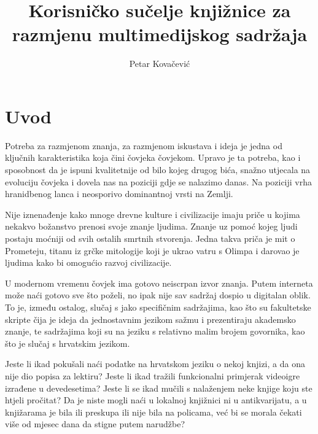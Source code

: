 \documentclass[times, utf8, zavrsni, numeric]{fer}
\newcommand{\razmakp}{\vspace{18pt}}
\begin{document}

\title{Korisničko sučelje knjižnice za razmjenu multimedijskog sadržaja}

\author{Petar Kovačević}

\maketitle

\izvornik

\zahvala{}


\tableofcontents


\chapter{Uvod}

Potreba za razmjenom znanja, za razmjenom iskustava i ideja je jedna od ključnih karakteristika koja čini čovjeka čovjekom.
Upravo je ta potreba, kao i sposobnost da je ispuni kvalitetnije od bilo kojeg drugog bića, snažno utjecala na evoluciju čovjeka i dovela nas na poziciji gdje se nalazimo danas.
Na poziciji vrha hranidbenog lanca i neosporivo dominantnoj vrsti na Zemlji.

Nije iznenađenje kako mnoge drevne kulture i civilizacije imaju priče u kojima nekakvo božanstvo prenosi svoje znanje ljudima.
Znanje uz pomoć kojeg ljudi postaju moćniji od svih ostalih smrtnih stvorenja.
Jedna takva priča je mit o Prometeju, titanu iz grčke mitologije koji je ukrao vatru s Olimpa i darovao je ljudima kako bi omogućio razvoj civilizacije.

\razmakp

U modernom vremenu čovjek ima gotovo neiscrpan izvor znanja.
Putem interneta može naći gotovo sve što poželi, no ipak nije sav sadržaj dospio u digitalan oblik.
To je, između ostalog, slučaj s jako specifičnim sadržajima, kao što su fakultetske skripte čija je ideja da jednostavnim jezikom sažmu i prezentiraju akademsko znanje, te sadržajima koji su na jeziku s relativno malim brojem govornika, kao što je slučaj s hrvatskim jezikom.

Jeste li ikad pokušali naći podatke na hrvatskom jeziku o nekoj knjizi, a da ona nije dio popisa za lektiru?
Jeste li ikad tražili funkcionalni primjerak videoigre izrađene u devedesetima?
Jeste li se ikad mučili s nalaženjem neke knjige koju ste htjeli pročitat?
Da je niste mogli naći u lokalnoj knjižnici ni u antikvarijatu, a u knjižarama je bila ili preskupa ili nije bila na policama, već bi se morala čekati više od mjesec dana da stigne putem narudžbe?
\end{document}
